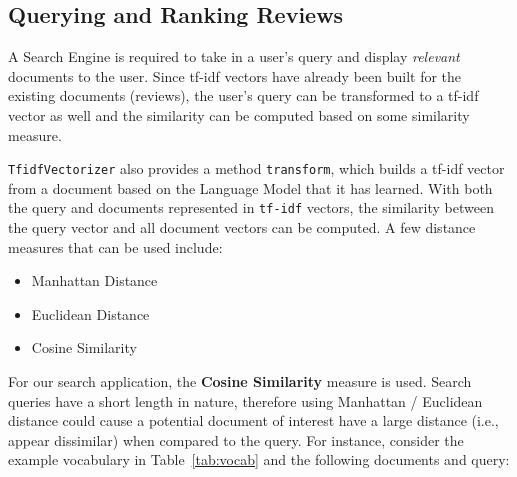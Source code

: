 \documentclass[sigconf,nonacm=true]{acmart}
\begin{document}
\subsection{Querying and Ranking Reviews}
A Search Engine is required to take in a user's query and display \textit{relevant} 
documents to the user. Since tf-idf vectors have already been built for the 
existing documents (reviews), the user's query can be transformed to a tf-idf vector
as well and the similarity can be computed based on some similarity measure.

\verb|TfidfVectorizer| also provides a method \verb|transform|, which builds a tf-idf
vector from a document based on the Language Model that it has learned. With both the
query and documents represented in \verb|tf-idf| vectors, the similarity between the
query vector and all document vectors can be computed. A few distance measures that
can be used include:

\begin{itemize}
	\item Manhattan Distance
	\item Euclidean Distance
	\item Cosine Similarity
\end{itemize}

For our search application, the \textbf{Cosine Similarity} measure is used.
Search queries have a short length in nature, therefore using Manhattan / 
Euclidean distance could cause a potential document of interest have a large
distance (i.e., appear dissimilar) when compared to the query. For instance,
consider the example vocabulary in Table~\ref{tab:vocab} and the following
documents and query:
\end{document}
